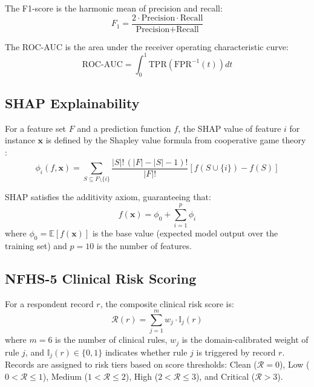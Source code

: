 The F1-score is the harmonic mean of precision and recall:
\begin{equation}
\label{eq:f1}
F_1 = \frac{2 \cdot \text{Precision} \cdot \text{Recall}}{\text{Precision} + \text{Recall}}
\end{equation}

The ROC-AUC is the area under the receiver operating characteristic curve:
\begin{equation}
\label{eq:roc-auc}
\text{ROC-AUC} = \int_0^1 \text{TPR}\!\left(\text{FPR}^{-1}(t)\right) dt
\end{equation}

\subsection{SHAP Explainability}

For a feature set $F$ and a prediction function $f$, the SHAP value of feature $i$ for instance $\mathbf{x}$ is defined by the Shapley value formula from cooperative game theory \cite{b6}:
\begin{equation}
\label{eq:shap}
\phi_i(f, \mathbf{x}) = \sum_{S \subseteq F \setminus \{i\}} \frac{|S|!\,(|F|-|S|-1)!}{|F|!} \left[ f(S \cup \{i\}) - f(S) \right]
\end{equation}

SHAP satisfies the additivity axiom, guaranteeing that:
\begin{equation}
\label{eq:shap-sum}
f(\mathbf{x}) = \phi_0 + \sum_{i=1}^{p} \phi_i
\end{equation}
where $\phi_0 = \mathbb{E}[f(\mathbf{x})]$ is the base value (expected model output over the training set) and $p = 10$ is the number of features.

\subsection{NFHS-5 Clinical Risk Scoring}

For a respondent record $r$, the composite clinical risk score is:
\begin{equation}
\label{eq:nfhs-score}
\mathcal{R}(r) = \sum_{j=1}^{m} w_j \cdot \mathbb{I}_j(r)
\end{equation}
where $m=6$ is the number of clinical rules, $w_j$ is the domain-calibrated weight of rule $j$, and $\mathbb{I}_j(r) \in \{0,1\}$ indicates whether rule $j$ is triggered by record $r$. Records are assigned to risk tiers based on score thresholds: Clean ($\mathcal{R}=0$), Low ($0 < \mathcal{R} \leq 1$), Medium ($1 < \mathcal{R} \leq 2$), High ($2 < \mathcal{R} \leq 3$), and Critical ($\mathcal{R} > 3$).

